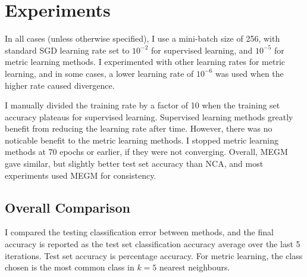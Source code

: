 \section {Experiments}

In all cases (unless otherwise specified), I use a mini-batch size of 256, with standard \gls{SGD} learning rate set to $ 10^{-2} $ for supervised learning, and $ 10^{-5} $ for metric learning methods. I experimented with other learning rates for metric learning, and in some cases, a lower learning rate of $ 10^{-6} $ was used when the higher rate caused divergence.

I manually divided the training rate by a factor of 10 when the training set accuracy plateaus for supervised learning. Supervised learning methods greatly benefit from reducing the learning rate after time. However, there was no noticable benefit to the metric learning methods. I stopped metric learning methods at 70 epochs or earlier, if they were not converging. Overall, \gls{MEGM} gave similar, but slightly better test set accuracy than \gls{NCA}, and most experiments used \gls{MEGM} for consistency.


\subsection{Overall Comparison}

I compared the testing classification error between methods, and the final accuracy is reported as the test set classification accuracy average over the last 5 iterations. Test set accuracy is percentage accuracy. For metric learning, the class chosen is the most common class in $k = 5$ nearest neighbours.



